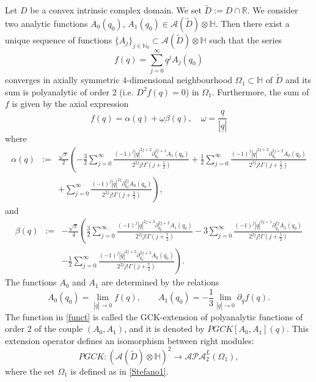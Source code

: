 \documentclass[10pt,a4paper]{amsart}
\begin{document}
\begin{theorem}
\label{pgck}
Let $D$ be a convex intrinsic complex domain. We set $\tilde{D}:=D \cap \mathbb{R}$. We consider two analytic functions $A_0(q_0)$, $A_1(q_0) \in \mathcal{A}(\tilde{D}) \otimes \mathbb{H}$. Then there exist a unique sequence of functions $ \{A_j\}_{j \in \mathbb{N}_0} \subset \mathcal{A}(\tilde{D}) \otimes \mathbb{H}$ such that the series
\begin{equation}
\label{fun1}
f(q)= \sum_{j=0}^{\infty} \underline{q}^jA_j(q_0)
\end{equation}
converges in axially symmetric $4$-dimensional neighbourhood $\Omega_1 \subset \mathbb{H}$ of $\tilde{D}$ and its sum is polyanalytic of order 2 (i.e. $D^2 f(q)=0$) in $\Omega_1$. Furthermore, the sum of $f$ is given by the axial expression
\begin{equation}
\label{funct}
f(q)= \alpha(q)+\underline{\omega} \beta(q), \quad \underline{\omega}=\frac{\underline{q}}{|\underline{q}|}
\end{equation}
where
\begin{eqnarray}
	\nonumber
	\alpha(q)&:=& \frac{\sqrt{\pi}}{2}\left(-\frac{3}{2}  \sum_{j=0}^{\infty} \frac{(-1)^j |\underline{q}|^{2j+2} \partial_{q_0}^{2j+1} A_1(q_0)}{2^{2 j} j! \Gamma \left(j+\frac{5}{2}\right)} + \frac{1}{2}  \sum_{j=0}^{\infty} \frac{(-1)^j |\underline{q}|^{2j+2} \partial_{q_0}^{2j+2}A_0(q_0)}{2^{2j} j! \Gamma \left(j+\frac{5}{2}\right)} \right.\\
	\label{real}
	&&\left.+ \sum_{j=0}^\infty \frac{(-1)^j |\underline{q}|^{2j} \partial_{q_0}^{2j} A_0(q_0)}{2^{2j}j! \Gamma \left(j+\frac{3}{2}\right)} \right),
\end{eqnarray}
and
\begin{eqnarray}
	\nonumber
	\beta(q)&:=& -  \frac{\sqrt{\pi}}{4}\left( \frac{3}{2} \sum_{j=0}^\infty \frac{(-1)^j |\underline{q}|^{2 j+3} \partial_{q_0}^{2 j+2}A_1(q_0)}{2^{2j}j! \Gamma \left(j+\frac{7}{2}\right)}- 3 \sum_{j=0}^\infty \frac{(-1)^j |\underline{q}|^{2j+1} \partial_{q_0}^{2j}A_1(q_0)}{2^{2j}j! \Gamma \left(j+\frac{5}{2}\right)} \right.\\
	\label{imm}
	&&\left. - \frac{1}{2} \sum_{j=0}^\infty \frac{(-1)^j |\underline{q}|^{2j+3} \partial_{q_0}^{2j+3} A_0(q_0)}{2^{2j} j! \Gamma \left(j+\frac{7}{2}\right)} \right).
\end{eqnarray}
The functions $A_0$ and $A_1$ are determined by the relations
\begin{equation}
\label{infun}
A_0(q_0)= \lim_{|\underline{q}| \to 0}f(q), \qquad
A_1(q_0)= -\frac{1}{3} \lim_{|\underline{q}| \to 0}\partial_{\underline{q}} f(q).
\end{equation}
The function in \eqref{funct} is called the GCK-extension of polyanalytic functions of order 2 of the couple $(A_0, A_1)$, and it is denoted by $PGCK[A_0,A_1](q)$. This extension operator defines an isomorphism between right modules:
$$ PGCK: (\mathcal{A}(\tilde{D}) \otimes \mathbb{H})^2 \to \mathcal{APA}_2^L(\Omega_1),$$
where the set $\Omega_1$ is defined as in \eqref{Stefano1}.
\end{theorem}	
\end{document}
